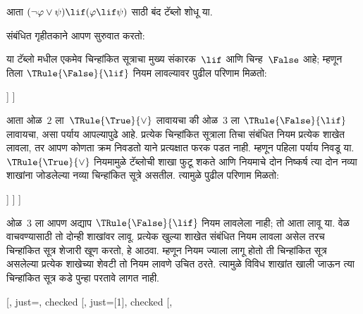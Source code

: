 \begin{ex}
आता $(\lnot \varphi \lor \psi) \lif (\varphi \lif \psi)$ साठी बंद टॅब्लो शोधू या.

संबंधित गृहीतकाने आपण सुरुवात करतो:
\begin{oltableau}
  [\sFmla{\False}{(\lnot \varphi \lor \psi) \lif
      (\varphi \lif \psi)}, just=\TAss]
\end{oltableau}
या टॅब्लो मधील एकमेव चिन्हांकित सूत्राचा मुख्य संकारक~$\lif$
आणि चिन्ह~$\False$ आहे; म्हणून तिला $\TRule{\False}{\lif}$ नियम लावल्यावर
पुढील परिणाम मिळतो:
\begin{oltableau}
  [\sFmla{\False}{(\lnot \varphi \lor \psi)
      \lif (\varphi \lif \psi)}, just=\TAss, checked
    [\sFmla{\True}{\lnot \varphi \lor \psi},
      just={\TRule{\False}{\lif}[1]}
      [\sFmla{\False}{(\varphi \lif \psi)},
        just={\TRule{\False}{\lif}[1]}
      ]
    ]
  ]
\end{oltableau}
आता ओळ~$2$ ला~$\TRule{\True}{\lor}$ लावायचा की ओळ~$3$ ला
$\TRule{\False}{\lif}$ लावायचा, असा पर्याय आपल्यापुढे आहे. प्रत्येक
चिन्हांकित सूत्राला तिचा संबंधित नियम प्रत्येक शाखेत लावला, तर आपण कोणता
क्रम निवडतो याने प्रत्यक्षात फरक पडत नाही. म्हणून पहिला पर्याय निवडू या.
$\TRule{\True}{\lor}$ नियमामुळे टॅब्लोची शाखा फुटू शकते आणि नियमाचे
दोन निष्कर्ष त्या दोन नव्या शाखांना जोडलेल्या नव्या चिन्हांकित सूत्रे
असतील. त्यामुळे पुढील परिणाम मिळतो:
\begin{oltableau}
  [\sFmla{\False}{(\lnot \varphi \lor \psi) \lif
      (\varphi \lif \psi)}, just=\TAss, checked
    [\sFmla{\True}{\lnot \varphi \lor \psi},
      just={\TRule{\False}{\lif}[1]}, checked
      [\sFmla{\False}{(\varphi \lif \psi)},
        just={\TRule{\False}{\lif}[1]}
        [\sFmla{\True}{\lnot \varphi}, just={\TRule{\True}{\lor}[2]}]
        [\sFmla{\True}{\psi}, just={\TRule{\True}{\lor}[2]}]
      ]
    ]
  ]
\end{oltableau}
ओळ~$3$ ला आपण अद्याप $\TRule{\False}{\lif}$ नियम लावलेला नाही; तो आता
लावू या. वेळ वाचवण्यासाठी तो दोन्ही शाखांवर लावू. प्रत्येक खुल्या शाखेत
संबंधित नियम लावला असेल तरच चिन्हांकित सूत्र शेजारी खूण करतो, हे आठवा.
म्हणून नियम ज्याला लागू होतो ती चिन्हांकित सूत्र असलेल्या प्रत्येक
शाखेच्या शेवटी तो नियम लावणे उचित ठरते. त्यामुळे विविध शाखांत खाली जाऊन त्या
चिन्हांकित सूत्र कडे पुन्हा परतावे लागत नाही.
\begin{oltableau}
  [\sFmla{\False}{(\lnot \varphi \lor \psi) \lif
      (\varphi \lif \psi)}, just=\TAss, checked
    [\sFmla{\True}{\lnot \varphi \lor \psi},
      just={\TRule{\False}{\lif}[1]}, checked
      [\sFmla{\False}{(\varphi \lif \psi)},

\end{oltableau}
\end{ex}
